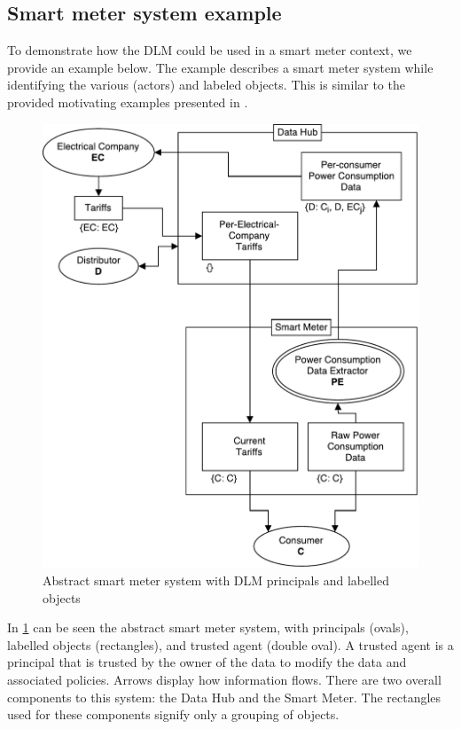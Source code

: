 \subsection{Smart meter system example}\label{dlm-example}
To demonstrate how the DLM could be used in a smart meter context, we provide an example below.
The example describes a smart meter system while identifying the various \principals{} (actors) and labeled objects.
This is similar to the provided motivating examples presented in \citet{myers1997decentralized}.

\begin{figure}[h]
\centering
\includegraphics[width=\textwidth]{figures/dlm_sm_example.pdf}
\caption{Abstract smart meter system with DLM principals and labelled objects}
\label{dlm:sm_example}
\end{figure}

In \cref{dlm:sm_example} can be seen the abstract smart meter system, with principals (ovals), labelled objects (rectangles), and trusted agent (double oval).
A trusted agent is a principal that is trusted by the owner of the data to modify the data and associated policies.
Arrows display how information flows.
There are two overall components to this system: the Data Hub and the Smart Meter.
The rectangles used for these components signify only a grouping of objects.

